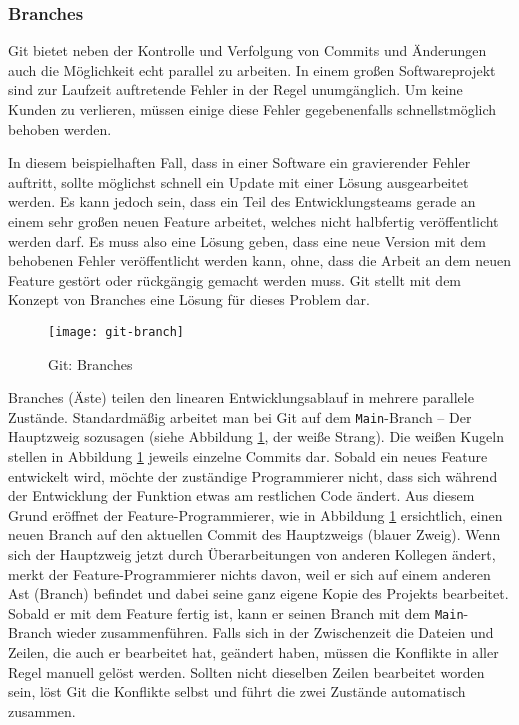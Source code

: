 \subsubsection{Branches}
Git bietet neben der Kontrolle und Verfolgung von Commits und Änderungen auch
die Möglichkeit echt parallel zu arbeiten. In einem großen Softwareprojekt sind
zur Laufzeit auftretende Fehler in der Regel unumgänglich. Um keine Kunden zu
verlieren, müssen einige diese Fehler gegebenenfalls schnellstmöglich behoben
werden.

In diesem beispielhaften Fall, dass in einer Software ein gravierender Fehler
auftritt, sollte möglichst schnell ein Update mit einer Lösung ausgearbeitet
werden. Es kann jedoch sein, dass ein Teil des Entwicklungsteams gerade an einem
sehr großen neuen Feature arbeitet, welches nicht halbfertig veröffentlicht
werden darf. Es muss also eine Lösung geben, dass eine neue Version mit dem
behobenen Fehler veröffentlicht werden kann, ohne, dass die Arbeit an dem neuen
Feature gestört oder rückgängig gemacht werden muss. Git stellt mit dem Konzept
von Branches eine Lösung für dieses Problem dar.

\begin{figure}[h]
    \centering
    \texttt{[image: git-branch]}
    \caption{Git: Branches}
    \label{fig:git-branch}
\end{figure}

Branches (Äste) teilen den linearen Entwicklungsablauf in mehrere parallele
Zustände. Standardmäßig arbeitet man bei Git auf dem \texttt{Main}-Branch -- Der
Hauptzweig sozusagen (siehe Abbildung \ref{fig:git-branch}, der weiße Strang).
Die weißen Kugeln stellen in Abbildung \ref{fig:git-branch} jeweils einzelne
Commits dar. Sobald ein neues Feature entwickelt wird, möchte der zuständige
Programmierer nicht, dass sich während der Entwicklung der Funktion etwas am
restlichen Code ändert. Aus diesem Grund eröffnet der Feature-Programmierer, wie
in Abbildung \ref{fig:git-branch} ersichtlich, einen neuen Branch auf den
aktuellen Commit des Hauptzweigs (blauer Zweig). Wenn sich der Hauptzweig jetzt
durch Überarbeitungen von anderen Kollegen ändert, merkt der
Feature-Programmierer nichts davon, weil er sich auf einem anderen Ast (Branch)
befindet und dabei seine ganz eigene Kopie des Projekts bearbeitet. Sobald er
mit dem Feature fertig ist, kann er seinen Branch mit dem \texttt{Main}-Branch
wieder zusammenführen. Falls sich in der Zwischenzeit die Dateien und Zeilen,
die auch er bearbeitet hat, geändert haben, müssen die Konflikte in aller Regel
manuell gelöst werden. Sollten nicht dieselben Zeilen bearbeitet worden sein,
löst Git die Konflikte selbst und führt die zwei Zustände automatisch zusammen.

